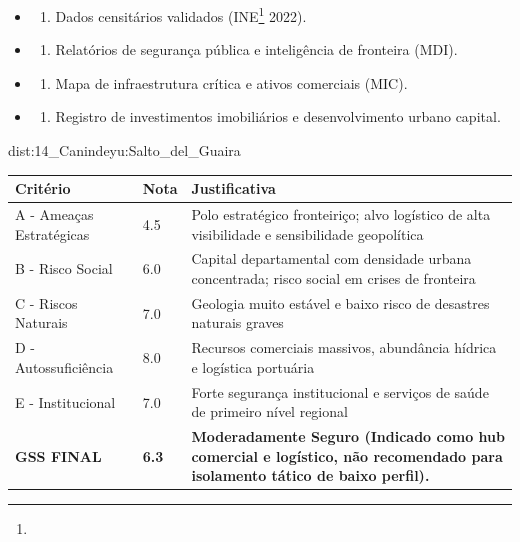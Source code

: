 {\begin{itemize}
\tightlist
\item
  \begin{enumerate}
  \def\labelenumi{\arabic{enumi})}
  \tightlist
  \item
    Dados censitários validados (INE\footnote{\fineINE} 2022).
  \end{enumerate}
\item
  \begin{enumerate}
  \def\labelenumi{\arabic{enumi})}
  \setcounter{enumi}{1}
  \tightlist
  \item
    Relatórios de segurança pública e inteligência de fronteira (MDI).
  \end{enumerate}
\item
  \begin{enumerate}
  \def\labelenumi{\arabic{enumi})}
  \setcounter{enumi}{2}
  \tightlist
  \item
    Mapa de infraestrutura crítica e ativos comerciais (MIC).
  \end{enumerate}
\item
  \begin{enumerate}
  \def\labelenumi{\arabic{enumi})}
  \setcounter{enumi}{3}
  \tightlist
  \item
    Registro de investimentos imobiliários e desenvolvimento urbano
    capital.
  \end{enumerate}
\end{itemize}}{dist:14_Canindeyu:Salto_del_Guaira}
\begin{table}[ht!]
\small \begin{tabular}{p{3.0cm}p{0.8cm}p{6.0cm}} \toprule
\textbf{Critério} & \textbf{Nota} & \textbf{Justificativa} \\ \midrule
A - Ameaças Estratégicas & 4.5 & Polo estratégico fronteiriço; alvo logístico de alta visibilidade e sensibilidade geopolítica \\
B - Risco Social & 6.0 & Capital departamental com densidade urbana concentrada; risco social em crises de fronteira \\
C - Riscos Naturais & 7.0 & Geologia muito estável e baixo risco de desastres naturais graves \\
D - Autossuficiência & 8.0 & Recursos comerciais massivos, abundância hídrica e logística portuária \\
E - Institucional & 7.0 & Forte segurança institucional e serviços de saúde de primeiro nível regional \\
\midrule \textbf{GSS FINAL} & \textbf{6.3} & \textbf{Moderadamente Seguro (Indicado como hub comercial e logístico, não recomendado para isolamento tático de baixo perfil).} \\ \bottomrule \end{tabular}
\end{table}
